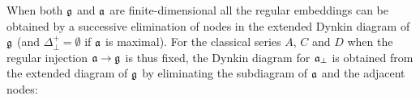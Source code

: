 \documentclass[12pt]{iopart}
\theoremstyle{definition}
\theoremstyle{definition}
\theoremstyle{definition}
\theoremstyle{definition}
\begin{document}
When both $\frak{g}$ and $\frak{a}$ are finite-dimensional all the regular
embeddings can be obtained by a successive elimination of nodes in the
extended Dynkin diagram of $\frak{g}$ (and $\Delta _{\bot }^{+}=\emptyset $
if $\frak{a}$ is maximal). For the classical series $A$, $C$ and $D$ when
the regular injection $\frak{a}\rightarrow \frak{g}$ is thus fixed, the
Dynkin diagram for $\frak{a}_{\bot }$ is obtained from the extended diagram
of $\frak{g}$ by eliminating the subdiagram of $\frak{a}$ and the adjacent
nodes:
\begin{table}[tbh]
\label{tab:diagrams} \noindent {}
\end{table}
\end{document}
